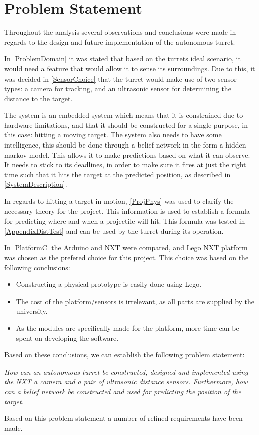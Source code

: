 \chapter{Problem Statement}

Throughout the analysis several observations and conclusions were made in
regards to the design and future implementation of the autonomous turret. 

In \autoref{ProblemDomain} it was stated that based on the turrets ideal
scenario, it would need a feature that would allow it to sense its
surroundings. Due to this, it was decided in \autoref{SensorChoice} that the
turret would make use of two sensor types: a camera for tracking, and an
ultrasonic sensor for determining the distance to the target.\nl

The system is an embedded system which means that it is constrained due to
hardware limitations, and that it should be constructed for a single purpose,
in this case: hitting a moving target. The system also needs to have some
intelligence, this should be done through a belief network in the form a hidden
markov model. This allows it to make predictions based on what it can
observe. It needs to stick to its deadlines, in order to make sure it fires
at just the right time such that it hits the target at the predicted
position, as described in \autoref{SystemDescription}.\nl

In regards to hitting a target in motion, \autoref{ProjPhys} was used to
clarify the necessary theory for the project. This information is used to
establish a formula for predicting where and when a projectile will hit. This
formula was tested in \autoref{AppendixDistTest} and can be used by the turret
during its operation.\nl

In \autoref{PlatformC} the Arduino and NXT were compared, and Lego NXT
platform was chosen as the prefered choice for this project. This choice was
based on the following conclusions:
\begin{itemize}
  \item Constructing a physical prototype is easily done using Lego.
  \item The cost of the platform/sensors is irrelevant, as all parts are
  supplied by the university.
  \item As the modules are specifically made for the platform, more time can be
  spent on developing the software.
\end{itemize}

Based on these conclusions, we can establish the following
problem statement:

\begin{center}
\begin{minipage}{0.8\linewidth}
\textit{How can an autonomous turret be constructed, designed and implemented
using the NXT a camera and a pair of ultrasonic distance sensors. Furthermore,
how can a belief network be constructed and used for predicting the position
of the target.}
\end{minipage}
\end{center}

Based on this problem statement a number of refined requirements have been made.
